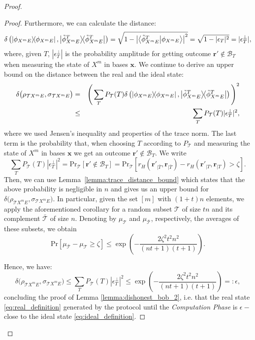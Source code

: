 \begin{proof}
\begin{proof}
Furthermore, we can calculate the distance:
\begin{equation*}
    \delta\left( \ketbra{\phi_{X^m E}}, \ketbra{\tilde{\phi}_{X^m E}^T} \right) = \sqrt{1 - \left|\braket{\tilde{\phi}_{X^m E}^T}{\phi_{X^m E}}\right|^2} 
=\sqrt{1 - |\epsilon_T|^2} 
= |\epsilon_T^\perp|,
\end{equation*}
 where,  given $T$,  $|\epsilon_T^\perp|$ is the probability amplitude for getting  outcome $\boldsymbol{r'} \notin \mathcal{B}_{T}$ when measuring the state of $X^m$ in bases $\boldsymbol{x}$.
We continue to derive an upper bound on the distance between the real and the ideal state: 
\begin{eqnarray*}
    \delta\big( \rho_{\mathcal{T}X^m E}, \sigma_{\mathcal{T}X^m E} \big) &=& \Bigg( \sum_T P_\mathcal{T}(T) \delta\left( \ketbra{\phi_{X^m E}}, \ketbra{\tilde{\phi}_{X^m E}^T} \right) \Bigg)^2\\
    & \leq &\sum_T P_\mathcal{T}(T) |\epsilon_T^\perp|^2, 
\end{eqnarray*}
where we used Jensen's inequality and properties of the trace norm. The last term is the probability that, when choosing $T$ according to $P_{\mathcal{T}}$ and measuring the state of $X^m$ in bases $\boldsymbol{x}$ we get an outcome  $\boldsymbol{r'} \notin \mathcal{B}_{T}$. We write  
\begin{equation*}
     \sum_T P_\mathcal{T}(T)|\epsilon_T^\perp|^2 = \text{Pr}_{\mathcal{T}}[\boldsymbol{r'} \notin \mathcal{B}_{T}] = \text{Pr}_{\mathcal{T}}[r_H(\boldsymbol{r'}_{|\bar{T}}, \boldsymbol{r}_{|\bar{T}}) - r_H(\boldsymbol{r'}_{|T}, \boldsymbol{r}_{|T}) > \zeta].
\end{equation*}
 Then, we can use Lemma~\ref{lemma:trace_distance_bound} which states that the above probability is negligible in $n$ and gives us an upper bound for $\delta\big( \rho_{\mathcal{T}X^m E}, \sigma_{\mathcal{T}X^m E} \big)$. In particular, given the set $[m]$ with $(1+t)n$ elements, we apply the aforementioned corollary for a random subset $\mathcal{T}$ of size $tn$ and its complement $\bar{\mathcal{T}}$ of size $n$. Denoting by $\mu_{\mathcal{T}}$ and $\mu_{\bar{\mathcal{T}}}$, respectively,  the averages of these subsets, we obtain
\begin{equation*}
\text{Pr}[\mu_{\bar{\mathcal{T}}} - \mu_{\mathcal{T}} \geq \zeta] \leq \exp( -\frac{2 \zeta^2t^2n^2}{(nt+1)(t+1)}).
    \end{equation*}

Hence, we have:
\begin{equation}
    \delta\big( \rho_{\mathcal{T}X^m E}, \sigma_{\mathcal{T}X^m E} \big) \leq  \sum_T P_\mathcal{T}(T)|\epsilon_T^\perp|^2 \leq \exp( -\frac{2 \zeta^2t^2n^2}{(nt+1)(t+1)})=: \epsilon,
\end{equation}
concluding the proof of Lemma \ref{lemma:dishonest_bob_2}, i.e. that the real state \eqref{eq:real_definition} generated by the protocol until the \textit{Computation Phase}  is  $\epsilon-$close to the ideal state \eqref{eq:ideal_definition}.
\end{proof}


\end{proof}
